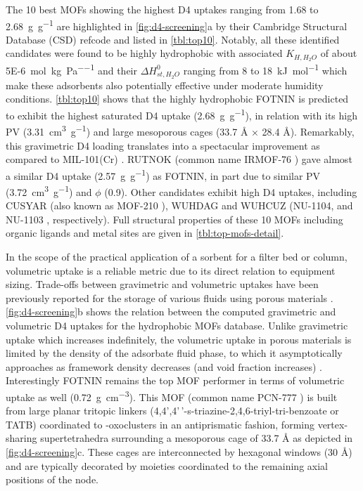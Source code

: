 The 10 best MOFs showing the highest D4 uptakes ranging from 1.68 to
\SI{2.68}{\gram\per\gram} are highlighted in \cref{fig:d4-screening}a by their
Cambridge Structural Database (CSD) \citep{allenCambridgeStructuralDatabase2002}
refcode and listed in \cref{tbl:top10}. Notably, all these identified candidates
were found to be highly hydrophobic with associated \(K_{H,H_{2}O}\) of about
\SI{5E-6}{\mol\per\kilo\gram\per\pascal} and their \(\Delta H_{st,H_{2}O}^{0}\)
ranging from 8 to \SI{18}{\kilo\joule\per\mol} which make these adsorbents also
potentially effective under moderate humidity conditions. \cref{tbl:top10} shows
that the highly hydrophobic FOTNIN is predicted to exhibit the highest saturated
D4 uptake (\SI{2.68}{\gram\per\gram}), in relation with its high PV
(\SI{3.31}{\centi\metre\cubed\per\gram}) and large mesoporous cages (33.7 Å ×
28.4 Å). Remarkably, this gravimetric D4 loading translates into a spectacular
improvement as compared to MIL-101(Cr)
\citep{gargiuloChromiumbasedMIL101Metal2019}. RUTNOK (common name IRMOF-76
\citep{oisakiMetalOrganicFramework2010}) gave almost a similar D4 uptake
(\SI{2.57}{\gram\per\gram}) as FOTNIN, in part due to similar PV
(\SI{3.72}{\centi\metre\cubed\per\gram}) and \(\phi\) (0.9). Other candidates
exhibit high D4 uptakes, including CUSYAR (also known as MOF-210
\citep{furukawaUltrahighPorosityMetalOrganic2010}), WUHDAG and WUHCUZ (NU-1104,
and NU-1103 \citep{wangUltrahighSurfaceArea2015}, respectively). Full structural
properties of these 10 MOFs including organic ligands and metal sites are given
in \cref{tbl:top-mofs-detail}.

In the scope of the practical application of a sorbent for a filter bed or
column, volumetric uptake is a reliable metric due to its direct relation to
equipment sizing. Trade-offs between gravimetric and volumetric uptakes have
been previously reported for the storage of various fluids using porous
materials \citep{moghadamComputeraidedDiscoveryMetal2018}.
\cref{fig:d4-screening}b shows the relation between the computed gravimetric and
volumetric D4 uptakes for the hydrophobic MOFs database. Unlike gravimetric
uptake which increases indefinitely, the volumetric uptake in porous materials
is limited by the density of the adsorbate fluid phase, to which it
asymptotically approaches as framework density decreases (and void fraction
increases) \citep{bobbittHighthroughputScreeningMetal2016}. Interestingly FOTNIN
remains the top MOF performer in terms of volumetric uptake as well
(\SI{0.72}{\gram\per\centi\metre\cubed}). This MOF (common name PCN-777
\citep{fengHighlyStableZeotype2015}) is built from large planar tritopic linkers
(4,4',4'\,'-s-triazine-2,4,6-triyl-tri-benzoate or TATB) coordinated to
-oxoclusters in an antiprismatic fashion, forming vertex-sharing
supertetrahedra surrounding a mesoporous cage of 33.7 Å as depicted in
\cref{fig:d4-screening}c. These cages are interconnected by hexagonal windows
(30 Å) and are typically decorated by  moieties coordinated to the
remaining axial positions of the  node.

